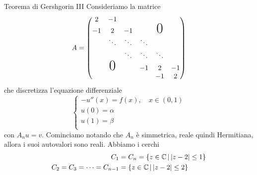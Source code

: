 \documentclass[a4paper]{article}
\begin{document}
\begin{snippetexample}{Teorema di Gershgorin III}
    Consideriamo la matrice
    \[
        A =
        \begin{pmatrix}
            2 & -1   &     &     &                &    \\
            -1   & 2 & -1   &     & \text{\huge 0} &    \\
            &   \ddots & \ddots & \ddots   &                &    \\
            &     &  \ddots  & \ddots & \ddots              &    \\
            & \text{\huge 0} &&       -1  & 2 & -1  \\
            &     &     &     &            -1  & 2
        \end{pmatrix}
    \]
    che discretizza l'equazione differenziale
    \[
        \begin{cases}
            -u''(x) = f(x), \quad x \in (0,1) \\
            u(0) = \alpha \\
            u(1) = \beta \\
        \end{cases}
    \]
    con \(A_n u = v\).
    Cominciamo notando che \(A_n\) è simmetrica, reale quindi Hermitiana,
    allora i suoi autovalori sono reali.
    Abbiamo i cerchi
    \begin{align*}
        C_1 &= C_n = \{ z \in \mathbb{C} \,|\, |z-2| \leq 1\} \\
        C_2 = C_3 = \cdots = C_{n-1} &= \{ z \in \mathbb{C} \,|\, |z-2| \leq 2\}
    \end{align*}
    \begin{figure}
        \begin{center}
            \vspace{1cm}
\end{center}
\end{figure}
\end{snippetexample}
\end{document}
